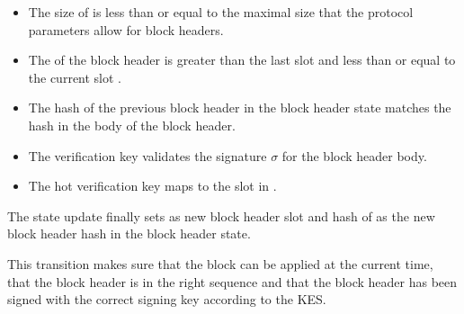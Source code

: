\begin{itemize}
\item The size of  is less than or equal to the maximal size that the
  protocol parameters allow for block headers.
\item The  of the block header is greater than the last slot and less
  than or equal to the current slot .
\item The hash  of the previous block header in the block header state
  matches the hash in the body of the block header.
\item The verification key validates the signature $\sigma$ for the block
  header body.
\item The hot verification key  maps to the slot  in
  .
\end{itemize}

The state update finally sets  as new block header slot and hash of
 as the new block header hash in the block header state.

This transition makes sure that the block can be applied at the current time,
that the block header is in the right sequence and that the block header has
been signed with the correct signing key according to the KES.

